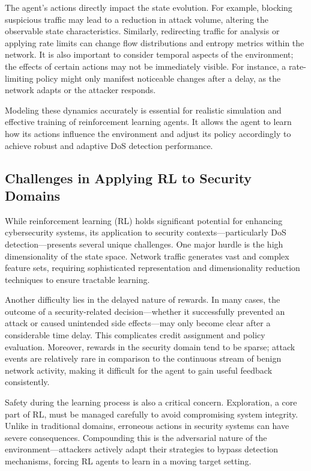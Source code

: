 \documentclass{report}
\begin{document}
The agent’s actions directly impact the state evolution. For example, blocking suspicious traffic may lead to a reduction in attack volume, altering the observable state characteristics. Similarly, redirecting traffic for analysis or applying rate limits can change flow distributions and entropy metrics within the network. It is also important to consider temporal aspects of the environment; the effects of certain actions may not be immediately visible. For instance, a rate-limiting policy might only manifest noticeable changes after a delay, as the network adapts or the attacker responds.

Modeling these dynamics accurately is essential for realistic simulation and effective training of reinforcement learning agents. It allows the agent to learn how its actions influence the environment and adjust its policy accordingly to achieve robust and adaptive DoS detection performance.



\subsection{Challenges in Applying RL to Security Domains}

While reinforcement learning (RL) holds significant potential for enhancing cybersecurity systems, its application to security contexts—particularly DoS detection—presents several unique challenges. One major hurdle is the high dimensionality of the state space. Network traffic generates vast and complex feature sets, requiring sophisticated representation and dimensionality reduction techniques to ensure tractable learning. 

Another difficulty lies in the delayed nature of rewards. In many cases, the outcome of a security-related decision—whether it successfully prevented an attack or caused unintended side effects—may only become clear after a considerable time delay. This complicates credit assignment and policy evaluation. Moreover, rewards in the security domain tend to be sparse; attack events are relatively rare in comparison to the continuous stream of benign network activity, making it difficult for the agent to gain useful feedback consistently.

Safety during the learning process is also a critical concern. Exploration, a core part of RL, must be managed carefully to avoid compromising system integrity. Unlike in traditional domains, erroneous actions in security systems can have severe consequences. Compounding this is the adversarial nature of the environment—attackers actively adapt their strategies to bypass detection mechanisms, forcing RL agents to learn in a moving target setting.
\end{document}
